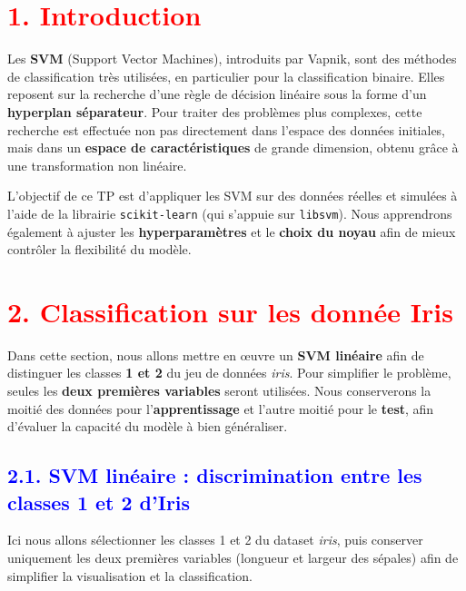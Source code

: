 \documentclass[
  12pt,
]{article}
\begin{document}
\section{\texorpdfstring{\textcolor{red}{1. Introduction}}{}}\label{section}

Les \textbf{SVM} (Support Vector Machines), introduits par Vapnik, sont
des méthodes de classification très utilisées, en particulier pour la
classification binaire. Elles reposent sur la recherche d'une règle de
décision linéaire sous la forme d'un \textbf{hyperplan séparateur}. Pour
traiter des problèmes plus complexes, cette recherche est effectuée non
pas directement dans l'espace des données initiales, mais dans un
\textbf{espace de caractéristiques} de grande dimension, obtenu grâce à
une transformation non linéaire.

L'objectif de ce TP est d'appliquer les SVM sur des données réelles et
simulées à l'aide de la librairie \texttt{scikit-learn} (qui s'appuie
sur \texttt{libsvm}). Nous apprendrons également à ajuster les
\textbf{hyperparamètres} et le \textbf{choix du noyau} afin de mieux
contrôler la flexibilité du modèle. \newpage

\section{\texorpdfstring{\textcolor{red}{2. Classification sur les donnée Iris}}{}}\label{section-1}

Dans cette section, nous allons mettre en œuvre un \textbf{SVM linéaire}
afin de distinguer les classes \textbf{1 et 2} du jeu de données
\textit{iris}. Pour simplifier le problème, seules les
\textbf{deux premières variables} seront utilisées. Nous conserverons la
moitié des données pour l'\textbf{apprentissage} et l'autre moitié pour
le \textbf{test}, afin d'évaluer la capacité du modèle à bien
généraliser.

\subsection{\texorpdfstring{\textcolor{blue}{2.1. SVM linéaire : discrimination entre les classes 1 et 2 d’Iris}}{}}\label{section-2}

Ici nous allons sélectionner les classes 1 et 2 du dataset
\textit{iris}, puis conserver uniquement les deux premières variables
(longueur et largeur des sépales) afin de simplifier la visualisation et
la classification.
\end{document}
